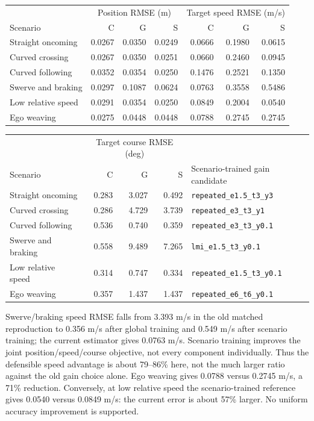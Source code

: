 \documentclass[11pt]{article}
\begin{document}
\begin{center}\small
\begin{tabular}{@{}lrrrrrr@{}}
\toprule
&\multicolumn{3}{c}{Position RMSE (m)}&\multicolumn{3}{c}{Target speed RMSE (m/s)}\\
Scenario&C&G&S&C&G&S\\
\midrule
Straight oncoming & 0.0267 & 0.0350 & 0.0249 & 0.0666 & 0.1980 & 0.0615 \\
Curved crossing & 0.0267 & 0.0350 & 0.0251 & 0.0660 & 0.2460 & 0.0945 \\
Curved following & 0.0352 & 0.0354 & 0.0250 & 0.1476 & 0.2521 & 0.1350 \\
Swerve and braking & 0.0297 & 0.1087 & 0.0624 & 0.0763 & 0.3558 & 0.5486 \\
Low relative speed & 0.0291 & 0.0354 & 0.0250 & 0.0849 & 0.2004 & 0.0540 \\
Ego weaving & 0.0275 & 0.0448 & 0.0448 & 0.0788 & 0.2745 & 0.2745 \\
\bottomrule
\end{tabular}\end{center}

\begin{center}\small
\begin{tabular}{@{}lrrrl@{}}
\toprule
&\multicolumn{3}{c}{Target course RMSE (deg)}&\\
Scenario&C&G&S&Scenario-trained gain candidate\\
\midrule
Straight oncoming & 0.283 & 3.027 & 0.492 & \texttt{repeated\_e1.5\_t3\_y3} \\
Curved crossing & 0.286 & 4.729 & 3.739 & \texttt{repeated\_e3\_t3\_y1} \\
Curved following & 0.536 & 0.740 & 0.359 & \texttt{repeated\_e3\_t3\_y0.1} \\
Swerve and braking & 0.558 & 9.489 & 7.265 & \texttt{lmi\_e1.5\_t3\_y0.1} \\
Low relative speed & 0.314 & 0.747 & 0.334 & \texttt{repeated\_e1.5\_t3\_y0.1} \\
Ego weaving & 0.357 & 1.437 & 1.437 & \texttt{repeated\_e6\_t6\_y0.1} \\
\bottomrule
\end{tabular}\end{center}

Swerve/braking speed RMSE falls from 3.393 m/s in the old matched reproduction
to 0.356 m/s after global training and 0.549 m/s after scenario training;
the current estimator gives 0.0763 m/s. Scenario training improves the joint
position/speed/course objective, not every component individually.
Thus the defensible speed advantage is about 79--86\% here, not the much
larger ratio against the old gain choice alone. Ego weaving gives
0.0788 versus 0.2745 m/s, a 71\% reduction. Conversely, at low relative speed
the scenario-trained reference gives 0.0540 versus 0.0849 m/s: the current
error is about 57\% larger. No uniform accuracy improvement is supported.
\end{document}
